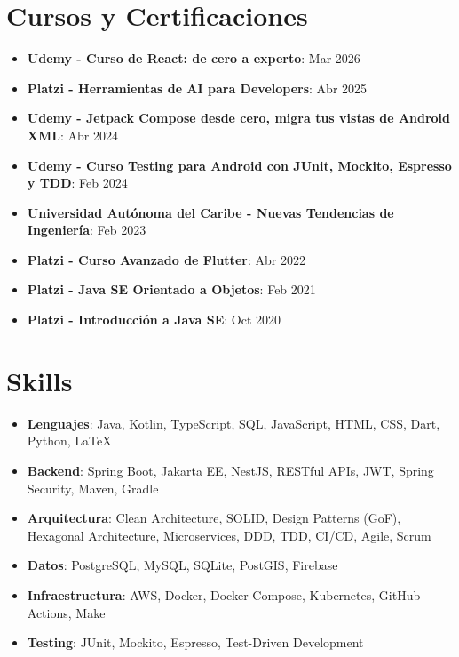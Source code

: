\documentclass[letterpaper,11pt]{article}
\newcommand{\resumeItem}[2]{
  \item\small{
    \textbf{#1}{: #2 \vspace{-2pt}}
  }
}
\newcommand{\resumeSubItem}[2]{\resumeItem{#1}{#2}\vspace{-4pt}}
\newcommand{\resumeSubHeadingListStart}{\begin{itemize}[leftmargin=*]}
\newcommand{\resumeSubHeadingListEnd}{\end{itemize}}
\begin{document}
\section{Cursos y Certificaciones}
\resumeSubHeadingListStart
\resumeSubItem{Udemy - Curso de React: de cero a experto}{Mar 2026}
\resumeSubItem{Platzi - Herramientas de AI para Developers}{Abr 2025}
\resumeSubItem{Udemy - Jetpack Compose desde cero, migra tus vistas de Android XML}{Abr 2024}
\resumeSubItem{Udemy - Curso Testing para Android con JUnit, Mockito, Espresso y TDD}{Feb 2024}
\resumeSubItem{Universidad Autónoma del Caribe - Nuevas Tendencias de Ingeniería}{Feb 2023}
\resumeSubItem{Platzi - Curso Avanzado de Flutter}{Abr 2022}
\resumeSubItem{Platzi - Java SE Orientado a Objetos}{Feb 2021}
\resumeSubItem{Platzi - Introducción a Java SE}{Oct 2020}
\resumeSubHeadingListEnd

\section{Skills}
\resumeSubHeadingListStart
\item{
      \textbf{Lenguajes}{: Java, Kotlin, TypeScript, SQL, JavaScript, HTML, CSS, Dart, Python, LaTeX}
}
\item{
      \textbf{Backend}{: Spring Boot, Jakarta EE, NestJS, RESTful APIs, JWT, Spring Security, Maven, Gradle}
}
\item{
      \textbf{Arquitectura}{: Clean Architecture, SOLID, Design Patterns (GoF), Hexagonal Architecture, Microservices, DDD, TDD, CI/CD, Agile, Scrum}
}
\item{
      \textbf{Datos}{: PostgreSQL, MySQL, SQLite, PostGIS, Firebase}
}
\item{
      \textbf{Infraestructura}{: AWS, Docker, Docker Compose, Kubernetes, GitHub Actions, Make}
}
\item{
      \textbf{Testing}{: JUnit, Mockito, Espresso, Test-Driven Development}
}
\resumeSubHeadingListEnd


\end{document}
